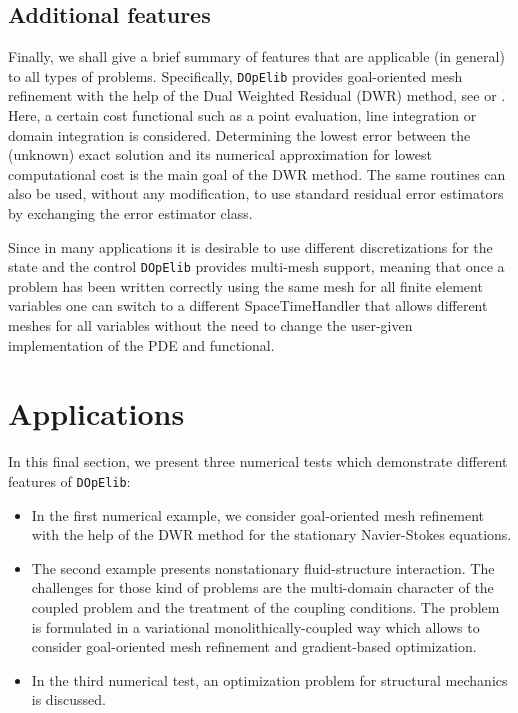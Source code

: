 \documentclass[prodmode,acmtoms]{acmsmall}
\numberwithin{equation}{section}
\newcommand{\dope}{\texttt{DOpElib}}
\begin{document}
\subsection{Additional features}
Finally, we shall give a brief summary of features 
that are applicable (in general) to all types of problems. Specifically,
\dope{} provides goal-oriented mesh refinement with the help of the 
Dual Weighted Residual (DWR) method, see \cite{BeRa96} or \cite{BR03}. Here, a certain 
cost functional such as a point evaluation, line integration or domain
integration is considered. Determining the lowest error between the 
(unknown) exact solution and its numerical approximation for lowest computational
cost is the main goal of the DWR method. The same routines 
can also be used, without any modification, to use standard residual error estimators by exchanging the 
error estimator class.

Since in many applications it is desirable to use different discretizations
for the state and the control \dope{} provides multi-mesh support, meaning that
once a problem has been written correctly using the same mesh for all finite element
variables one can switch to a different SpaceTimeHandler that allows different meshes for all 
variables without the need to change the user-given implementation of the PDE and functional.

\section{Applications}
\label{applications}
In this final section, 
we present three numerical tests which demonstrate different
features of \dope{}:
\begin{itemize}
\item In the first numerical example, we consider 
goal-oriented mesh refinement with the help of the 
DWR method for the stationary Navier-Stokes equations.
\item The second example presents nonstationary fluid-structure 
interaction. The challenges for those kind of problems are the multi-domain
character of the coupled problem and the treatment of the coupling conditions.
The problem is formulated in a variational monolithically-coupled way which 
allows to consider goal-oriented mesh refinement and gradient-based optimization.
\item In the third numerical test, an optimization problem for structural mechanics
is discussed.
\end{itemize}
\end{document}
